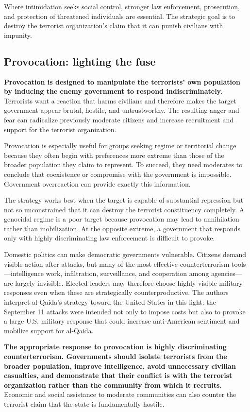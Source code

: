 Where intimidation seeks social control, stronger law enforcement, prosecution, and protection of threatened individuals are essential. The strategic goal is to destroy the terrorist organization's claim that it can punish civilians with impunity.

\subsection{Provocation: lighting the fuse}

\textbf{Provocation is designed to manipulate the terrorists' own population by inducing the enemy government to respond indiscriminately.} Terrorists want a reaction that harms civilians and therefore makes the target government appear brutal, hostile, and untrustworthy. The resulting anger and fear can radicalize previously moderate citizens and increase recruitment and support for the terrorist organization.

Provocation is especially useful for groups seeking regime or territorial change because they often begin with preferences more extreme than those of the broader population they claim to represent. To succeed, they need moderates to conclude that coexistence or compromise with the government is impossible. Government overreaction can provide exactly this information.

The strategy works best when the target is capable of substantial repression but not so unconstrained that it can destroy the terrorist constituency completely. A genocidal regime is a poor target because provocation may lead to annihilation rather than mobilization. At the opposite extreme, a government that responds only with highly discriminating law enforcement is difficult to provoke.

Domestic politics can make democratic governments vulnerable. Citizens demand visible action after attacks, but many of the most effective counterterrorism tools---intelligence work, infiltration, surveillance, and cooperation among agencies---are largely invisible. Elected leaders may therefore choose highly visible military responses even when these are strategically counterproductive. The authors interpret al-Qaida's strategy toward the United States in this light: the September 11 attacks were intended not only to impose costs but also to provoke a large U.S. military response that could increase anti-American sentiment and mobilize support for al-Qaida.

\textbf{The appropriate response to provocation is highly discriminating counterterrorism. Governments should isolate terrorists from the broader population, improve intelligence, avoid unnecessary civilian casualties, and demonstrate that their conflict is with the terrorist organization rather than the community from which it recruits.} Economic and social assistance to moderate communities can also counter the terrorist claim that the state is fundamentally hostile.

